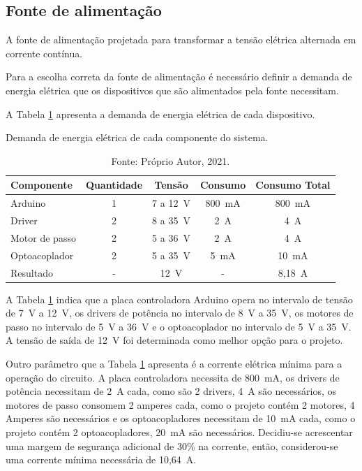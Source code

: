\subsection{Fonte de alimentação}\label{subsec:metfonte}

A fonte de alimentação projetada para transformar a tensão elétrica alternada em corrente contínua.

Para a escolha correta da fonte de alimentação é necessário definir a demanda de energia elétrica 
que os dispositivos que são alimentados pela fonte necessitam.

A Tabela \ref{tab:demandafonte} apresenta a demanda de energia elétrica de cada dispositivo.

\begin{table}
    \centering
    \caption{Demanda de energia elétrica de cada componente do sistema.}
    \begin{tabular}{lcccc}
        \hline
        \textbf{Componente} & \textbf{Quantidade} & \textbf{Tensão} & \textbf{Consumo} & \textbf{Consumo Total}\\
        \hline
        Arduino & 1 & 7 a 12~V & 800~mA & 800~mA\\
        Driver & 2 & 8 a 35~V & 2~A & 4~A\\
        Motor de passo & 2 & 5 a 36~V & 2~A & 4~A\\
        Optoacoplador & 2 & 5 a 35~V & 5~mA & 10~mA\\
        Resultado & - & 12~V & - & 8,18~A\\
        \hline       
    \end{tabular}
    \caption*{Fonte: Próprio Autor, 2021.}
    \label{tab:demandafonte}
\end{table}

A Tabela \ref{tab:demandafonte} indica que a placa controladora Arduino opera no intervalo de tensão de 7~V 
a 12~V, os drivers de potência no intervalo de 8~V a 35~V, os motores de passo no intervalo de 5~V a 36~V 
e o optoacoplador no intervalo de 5~V a 35~V. A tensão de saída de 12~V foi determinada como melhor 
opção para o projeto.

Outro parâmetro que a Tabela \ref{tab:demandafonte} apresenta é a corrente elétrica mínima para a operação 
do circuito. A placa controladora necessita de 800~mA, os drivers de potência necessitam de 2~A cada, 
como são 2 drivers, 4~A são necessários, os motores de passo consomem 2 amperes cada, como o projeto 
contém 2 motores, 4 Amperes são necessários e os optoacopladores necessitam de 10~mA cada, como o 
projeto contém 2 optoacopladores, 20~mA são necessários. Decidiu-se acrescentar uma margem de 
segurança adicional de 30\% na corrente, então, considerou-se uma corrente mínima necessária de 10,64~A.

